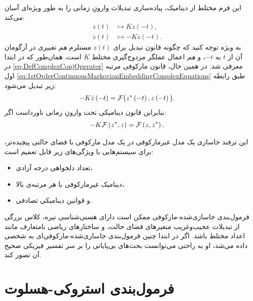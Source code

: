\documentclass{article}
\begin{document}
این فرم مختلط از دینامیک، پیاده‌سازی تبدیلات وارونِ زمانی را به طور ویژه‌ای آسان می‌کند:
\begin{equation}
\begin{aligned}z\left(t\right) & \mapsto Kz\left(-t\right),\\
\dot{z}\left(t\right) & \mapsto-K\dot{z}\left(-t\right).
\end{aligned}
\label{eq:1stOrderContinuousMarkovianEmbeddingComplexTimeRevFromOp}
\end{equation}
 به ویژه توجه کنید که چگونه قانون تبدیل برای $z\left(t\right)$ مستلزم \emph{هم} تغییری در آرگومان آن از $t$ به $-t$، و \emph{هم} اعمال عملگر مزدوج‌گیری مختلط $K$ است، همان‌طور که در ابتدا در \eqref{eq:DefComplexConjOperator} معرفی شد. در همین حال، قانون مارکوفی مرتبه اول \eqref{eq:1stOrderContinuousMarkovianEmbeddingComplexEquations} طبق رابطه زیر تبدیل می‌شود:
\begin{equation}
-K\dot{z}\left(-t\right)=\mathcal{F}\big(z^{\ast}\left(-t\right),z\left(-t\right)\big).\label{eq:1stOrderContinuousMarkovianEmbeddingComplexEquationsTimeRev}
\end{equation}
 بنابراین قانون دینامیکی تحت وارونِ زمانی ناورداست اگر:
\begin{equation}
-K\mathcal{F}\left(z^{\ast},z\right)=\mathcal{F}\left(z,z^{\ast}\right).\label{eq:1stOrderContinuousMarkovianEmbeddingComplexTimeRevInvariant}
\end{equation}

این ترفند جاسازی یک مدل غیرمارکوفی در یک مدل مارکوفی با فضای حالتی پیچیده‌تر، برای سیستم‌هایی با ویژگی‌های زیر قابل تعمیم است:
\begin{itemize}
\item تعداد دلخواهی درجه آزادی،
\item دینامیک غیرمارکوفی با هر مرتبه‌ی بالا،
\item و قوانین دینامیکی تصادفی.
\end{itemize}
فرمول‌بندی جاسازی‌شده-مارکوفی ممکن است دارای هستی‌شناسی تیره، کلاس بزرگی از تبدیلات عجیب‌وغریب متغیرهای فضای حالت، و ساختارهای ریاضی نامتعارف مانند اعداد مختلط باشد. اگر در ابتدا چنین فرمول‌بندی جاسازی‌شده-مارکوفی‌ای به شخصی داده می‌شد، او به راحتی می‌توانست بحث‌های بی‌پایانی را بر سر تفسیر فیزیکی صحیح آن تصور کند.

\section{فرمول‌بندی استروکی-هسلوت\label{sec:The-Strocchi-Heslot-Formulation}}
\end{document}
